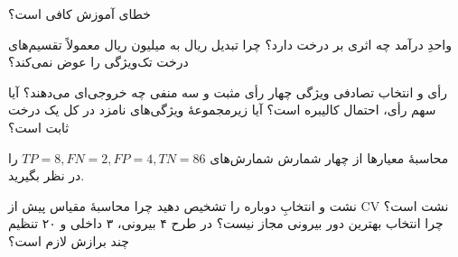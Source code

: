 \begin{selftests}
\begin{selftest}{خطای آموزش کافی است؟}
\end{selftest}
\begin{selftest}{واحدِ درآمد چه اثری بر درخت دارد؟}
چرا تبدیل ریال به میلیون ریال معمولاً تقسیم‌های درخت تک‌ویژگی را عوض نمی‌کند؟
\end{selftest}
\begin{selftest}{رأی و انتخاب تصادفی ویژگی}
چهار رأی مثبت و سه منفی چه خروجی‌ای می‌دهند؟ آیا سهم رأی، احتمال کالیبره است؟ آیا زیرمجموعهٔ ویژگی‌های نامزد در کل یک درخت ثابت است؟
\end{selftest}
\begin{selftest}{محاسبهٔ معیارها از چهار شمارش}
شمارش‌های $TP=8,FN=2,FP=4,TN=86$ را در نظر بگیرید.
\end{selftest}
\begin{selftest}{نشت و انتخابِ دوباره را تشخیص دهید}
چرا محاسبهٔ مقیاس پیش از CV نشت است؟ چرا انتخاب بهترین دور بیرونی مجاز نیست؟ در طرح ۴ بیرونی، ۳ داخلی و ۲۰ تنظیم چند برازش لازم است؟
\end{selftest}
\end{selftests}
